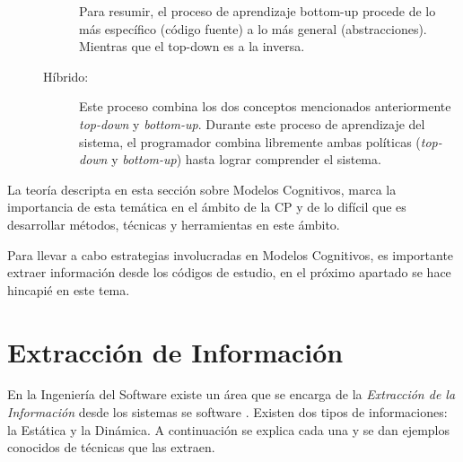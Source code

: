 \begin{description}
\begin{description}
Para resumir, el proceso de aprendizaje bottom-up procede de lo más específico (código fuente) a lo más general (abstracciones). Mientras que el top-down es a la inversa.

\item[Híbrido:] Este proceso combina los dos conceptos mencionados anteriormente \textit{top-down} y \textit{bottom-up}. Durante este proceso de aprendizaje del sistema, el programador combina libremente ambas políticas (\textit{top-down} y \textit{bottom-up}) hasta lograr comprender el sistema.
\end{description}
\end{description}


La teoría descripta en esta sección sobre Modelos Cognitivos, marca la importancia de esta temática en el ámbito de la CP y de lo difícil que es desarrollar métodos, técnicas y herramientas en este ámbito.

Para llevar a cabo estrategias involucradas en Modelos Cognitivos, es importante extraer información desde los códigos de estudio, en el próximo apartado se hace hincapié en este tema.

\section{Extracción de Información}

En la Ingeniería del Software existe un área que se encarga de la \textit{Extracción de la Información} desde los sistemas se software \cite{HCLZ08,LHFC95,IACM08}. 
Existen dos tipos de informaciones: la Estática y la Dinámica. A continuación se explica cada una y se dan ejemplos conocidos de técnicas que las extraen.

